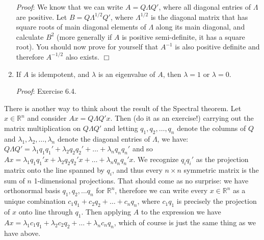 \documentclass[12pt,oneside]{article}
\begin{document}
\begin{enumerate}
\emph{Proof}: We know that we can write $A = Q \Lambda Q'$, where all
  diagonal entries of $\Lambda$ are positive. Let $B = Q \Lambda^{1/2}
  Q'$, where $\Lambda^{1/2}$ is the diagonal matrix that has square
  roots of main diagonal elements of $\Lambda$ along its main
  diagonal, and calculate $B^2$ (more generally if $A$ is positive
  semi-definite, it has a square root). You should now prove for yourself
  that $A^{-1}$ is also positive definite and therefore $A^{-1/2}$
  also exists. $\Box$


\item If $A$ is idempotent, and $\lambda$ is an
  eigenvalue of $A$, then $\lambda = 1$ or $\lambda = 0$.

 \emph{Proof}: Exercise 6.4.

\end{enumerate}

There is another way to think about the result of the Spectral
  theorem. Let $x \in \mathbb{R}^n$ and consider $Ax = Q \Lambda Q'
  x$. Then (do it as an exercise!) carrying out the matrix
  multiplication on $Q \Lambda Q'$ and letting $q_1, q_2, \ldots, q_n$
  denote the columns of $Q$ and $\lambda_1, \lambda_2, \ldots,
  \lambda_n$ denote the diagonal entries of $\Lambda$, we have: $Q
  \Lambda Q'= \lambda_1 q_1 q_1' + \lambda_2 q_2 q_2' + \ldots +
  \lambda_n q_n q_n'$ and so $Ax = \lambda_1 q_1 q_1' x + \lambda_2
  q_2 q_2' x + \ldots + \lambda_n q_n q_n' x$. We recognize $q_i q_i'$
  as the projection matrix onto the line spanned by $q_i$, and thus
  every $n \times n$ symmetric matrix is the sum of $n$ 1-dimensional
  projections. That should come as no surprise: we have orthonormal
  basis $q_1, q_2, \ldots q_n$ for $\mathbb{R}^n$, therefore we can
  write every $x \in \mathbb{R}^n$ as a unique combination $c_1 q_1 +
  c_2 q_2 + \ldots + c_n q_n$, where $c_1 q_1$ is precisely the
  projection of $x$ onto line through $q_1$. Then applying $A$ to the
  expression we have $Ax = \lambda_1 c_1 q_1 + \lambda_2 c_2 q_2 +
  \ldots + \lambda_n c_n q_n$, which of course is just the same thing
  as we have above.
\end{document}

